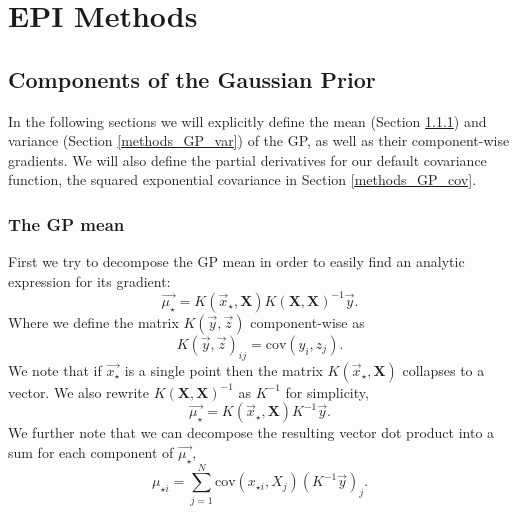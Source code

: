 \documentclass[phd,tocprelim]{cornell}
\begin{document}

\chapter{EPI Methods} %
\label{cha:EPI Methods}

\section{Components of the Gaussian Prior}
\label{comp_of_gp}

In the following sections we will explicitly define the mean (Section \ref{methods_GP_mean}) and variance (Section \ref{methods_GP_var}) of the GP, as well as their component-wise gradients. We will also define the partial derivatives for our default covariance function, the squared exponential covariance in Section \ref{methods_GP_cov}.

\subsection{The GP mean}
\label{methods_GP_mean}

First we try to decompose the GP mean in order to easily find an analytic expression for its gradient:
\begin{equation}
 \vec{\mu_{\star}} = K(\vec{x}_{\star}, \textbf{X} )K(\textbf{X},\textbf{X})^{-1}\vec{y}.
\end{equation}
Where we define the matrix $K(\vec{y}, \vec{z})$ component-wise as
\begin{equation}
 K(\vec{y}, \vec{z})_{ij} = \mbox{cov}(y_{i}, z_{j}).
\end{equation}
We note that if $\vec{x_{\star}}$ is a single point then the matrix $K(\vec{x}_{\star}, \textbf{X} )$ collapses to a vector. We also rewrite $K(\textbf{X},\textbf{X})^{-1}$ as $K^{-1}$ for simplicity,
\begin{equation}
 \vec{\mu_{\star}} = K(\vec{x}_{\star}, \textbf{X} ) K^{-1} \vec{y}.
\end{equation}
We further note that we can decompose the resulting vector dot product into a sum for each component of $\vec{\mu_{\star}}$,
\begin{equation}
 \mu_{\star {i}} = \sum_{j = 1}^{N} \mbox{cov}(x_{\star i}, X_{j}) \left(K^{-1} \vec{y} \right)_{j}.
\end{equation}
\end{document}
